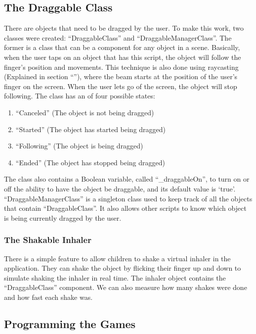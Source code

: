 \subsection{The Draggable Class}
\label{DraggableClass}
There are objects that need to be dragged by the user. To make this work, two classes were created: “{\codefont DraggableClass}” and “{\codefont DraggableManagerClass}”. The former is a class that can be a component for any object in a scene. Basically, when the user taps on an object that has this script, the object will follow the finger’s position and movements. This technique is also done using raycasting (Explained in section “”), where the beam starts at the position of the user's finger on the screen. When the user lets go of the screen, the object will stop following. The class has an  of four possible states:
\begin{enumerate}

\item{“Canceled” (The object is not being dragged)}
\item{“Started” (The object has started being dragged)}
\item{“Following” (The object is being dragged)}
\item{“Ended” (The object has stopped being dragged)}
\end{enumerate}
The class also contains a Boolean variable, called “{\codefont \_draggableOn}”, to turn on or off the ability to have the object be draggable, and its default value is ‘{\codefont true}’. “{\codefont DraggableManagerClass}” is a singleton class used to keep track of all the objects that contain “{\codefont DraggableClass}”. It also allows other scripts to know which object is being currently dragged by the user.

\subsubsection*{The Shakable Inhaler}
There is a simple feature to allow children to shake a virtual inhaler in the application. They can shake the object by flicking their finger up and down to simulate shaking the inhaler in real time. The inhaler object contains the “{\codefont DraggableClass}” component. We can also measure how many shakes were done and how fast each shake was.


\subsection{Programming the Games}

